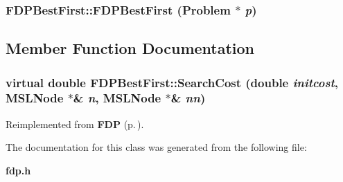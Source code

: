 \subsubsection{\setlength{\rightskip}{0pt plus 5cm}FDPBest\-First::FDPBest\-First ({\bf Problem} $\ast$ {\em p})}\label{class_FDPBestFirst_a0}




\subsection{Member Function Documentation}
\subsubsection{\setlength{\rightskip}{0pt plus 5cm}virtual double FDPBest\-First::Search\-Cost (double {\em initcost}, {\bf MSLNode} $\ast$\& {\em n}, {\bf MSLNode} $\ast$\& {\em nn})\hspace{0.3cm}{\tt  [protected, virtual]}}\label{class_FDPBestFirst_b0}




Reimplemented from {\bf FDP} {\rm (p.\,\pageref{class_FDP_b0})}.

The documentation for this class was generated from the following file:\begin{CompactItemize}
\item 
{\bf fdp.h}\end{CompactItemize}
